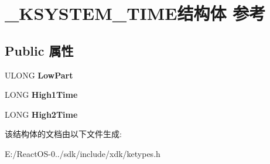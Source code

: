 \hypertarget{struct___k_s_y_s_t_e_m___t_i_m_e}{}\section{\+\_\+\+K\+S\+Y\+S\+T\+E\+M\+\_\+\+T\+I\+M\+E结构体 参考}
\label{struct___k_s_y_s_t_e_m___t_i_m_e}
\subsection*{Public 属性}
\begin{DoxyCompactItemize}
\item 
\mbox{\label{struct___k_s_y_s_t_e_m___t_i_m_e_a7e5f6afc567e66eae778e8baca6cef41}} 
U\+L\+O\+NG {\bfseries Low\+Part}
\item 
\mbox{\label{struct___k_s_y_s_t_e_m___t_i_m_e_a0941b482103748a8e302e352cb42daa2}} 
L\+O\+NG {\bfseries High1\+Time}
\item 
\mbox{\label{struct___k_s_y_s_t_e_m___t_i_m_e_a251040bf2fd9fcb7e9cbf1f2693cb606}} 
L\+O\+NG {\bfseries High2\+Time}
\end{DoxyCompactItemize}


该结构体的文档由以下文件生成\+:\begin{DoxyCompactItemize}
\item 
E\+:/\+React\+O\+S-\/0../sdk/include/xdk/ketypes.\+h\end{DoxyCompactItemize}
